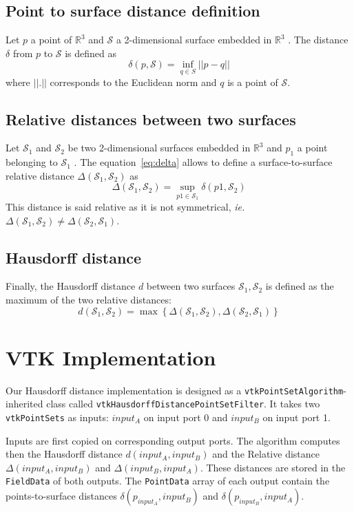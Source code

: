 \documentclass{InsightArticle}
\begin{document}
\subsection{Point to surface distance definition}
%
Let $p$ a point of $\mathbb{R}^3$ and $\mathcal{S}$ a 2-dimensional surface embedded in $\mathbb{R}^3$ . The distance $\delta$ from $p$ to $\mathcal{S}$ is defined as 
%
\begin{equation}
  \delta(p,\mathcal{S}) = \inf_{q \in S} ||p - q||
\label{eq:delta}
\end{equation}
%
where $|| . ||$ corresponds to the Euclidean norm and $q$ is a point of $\mathcal{S}$. 
%
\subsection{Relative distances between two surfaces}
%
Let $\mathcal{S}_1$ and $\mathcal{S}_2$ be two 2-dimensional surfaces embedded in $\mathbb{R}^3$ and $p_1$ a point belonging to $\mathcal{S}_1$ . The equation~\eqref{eq:delta} allows to define a surface-to-surface relative distance $\Delta(\mathcal{S}_1,\mathcal{S}_2)$ as
%
\begin{equation}
  \Delta(\mathcal{S}_1,\mathcal{S}_2) = \sup_{p1 \in \mathcal{S}_1}  \delta(p1,\mathcal{S}_2)
\label{eq:Delta}
\end{equation}
%
This distance is said relative as it is not symmetrical, \textit{ie.} $\Delta(\mathcal{S}_1,\mathcal{S}_2) \ne \Delta(\mathcal{S}_2,\mathcal{S}_1)$.
%
\subsection{Hausdorff distance}
%
Finally, the Hausdorff distance $d$ between two surfaces $\mathcal{S}_1,\mathcal{S}_2$ is defined as the maximum of the two relative distances:
\begin{equation}
  d(\mathcal{S}_1,\mathcal{S}_2) = \max \left\{ \Delta(\mathcal{S}_1,\mathcal{S}_2), \Delta(\mathcal{S}_2,\mathcal{S}_1)\right\}
\end{equation}
%
\section{VTK Implementation}
%
Our Hausdorff distance implementation is designed as a \verb!vtkPointSetAlgorithm!-inherited class called \verb!vtkHausdorffDistancePointSetFilter!. It takes two \verb!vtkPointSets! as inputs: $input_A$ on input port 0 and $input_B$ on input port 1. 

Inputs are first copied on corresponding output ports. The algorithm computes then the Hausdorff distance $d(input_A,input_B)$ and the Relative distance $\Delta(input_A,input_B)$ and $\Delta(input_B,input_A)$. These distances are stored in the \verb!FieldData! of both outputs. The \verb!PointData! array of each output contain the points-to-surface distances $\delta(p_{input_A},input_B)$ and $\delta(p_{input_B},input_A)$.
%
\end{document}
